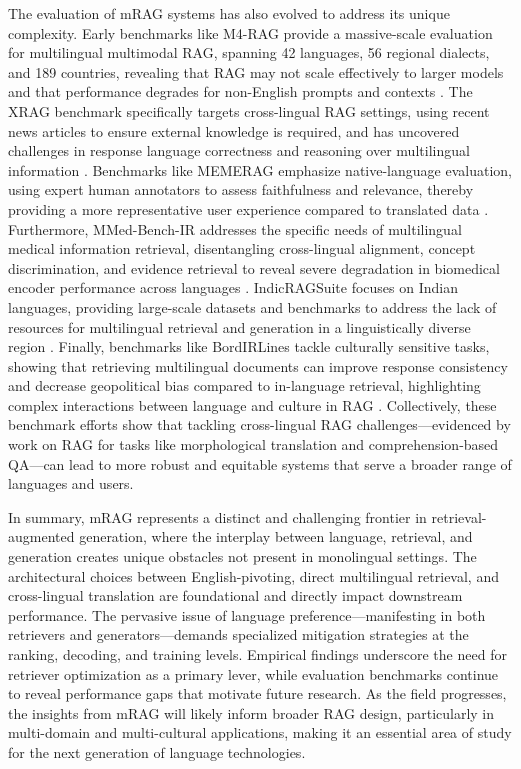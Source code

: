 \documentclass[11pt]{article}
\begin{document}
The evaluation of mRAG systems has also evolved to address its unique complexity. Early benchmarks like M4-RAG provide a massive-scale evaluation for multilingual multimodal RAG, spanning 42 languages, 56 regional dialects, and 189 countries, revealing that RAG may not scale effectively to larger models and that performance degrades for non-English prompts and contexts \cite{ref368}. The XRAG benchmark specifically targets cross-lingual RAG settings, using recent news articles to ensure external knowledge is required, and has uncovered challenges in response language correctness and reasoning over multilingual information \cite{ref383}. Benchmarks like MEMERAG emphasize native-language evaluation, using expert human annotators to assess faithfulness and relevance, thereby providing a more representative user experience compared to translated data \cite{ref384}. Furthermore, MMed-Bench-IR addresses the specific needs of multilingual medical information retrieval, disentangling cross-lingual alignment, concept discrimination, and evidence retrieval to reveal severe degradation in biomedical encoder performance across languages \cite{ref385}. IndicRAGSuite focuses on Indian languages, providing large-scale datasets and benchmarks to address the lack of resources for multilingual retrieval and generation in a linguistically diverse region \cite{ref386}. Finally, benchmarks like BordIRLines tackle culturally sensitive tasks, showing that retrieving multilingual documents can improve response consistency and decrease geopolitical bias compared to in-language retrieval, highlighting complex interactions between language and culture in RAG \cite{ref387}. Collectively, these benchmark efforts show that tackling cross-lingual RAG challenges---evidenced by work on RAG for tasks like morphological translation and comprehension-based QA---can lead to more robust and equitable systems that serve a broader range of languages and users.

In summary, mRAG represents a distinct and challenging frontier in retrieval-augmented generation, where the interplay between language, retrieval, and generation creates unique obstacles not present in monolingual settings. The architectural choices between English-pivoting, direct multilingual retrieval, and cross-lingual translation are foundational and directly impact downstream performance. The pervasive issue of language preference---manifesting in both retrievers and generators---demands specialized mitigation strategies at the ranking, decoding, and training levels. Empirical findings underscore the need for retriever optimization as a primary lever, while evaluation benchmarks continue to reveal performance gaps that motivate future research. As the field progresses, the insights from mRAG will likely inform broader RAG design, particularly in multi-domain and multi-cultural applications, making it an essential area of study for the next generation of language technologies.
\end{document}
